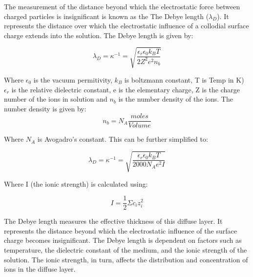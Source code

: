 The measurement of the distance beyond which the electrostatic force between charged particles is insignificant is known as the The Debye length ($\lambda_D$). It represents the distance over which the electrostatic influence of a collodial surface charge extends into the solution. The Debye length is given by:

\begin{equation}
\lambda_D = \kappa^{-1} = \sqrt{ \frac{ \epsilon_r \epsilon_0 k_B T}{2Z^2 e^2 n_b}}
\end{equation}

Where $\epsilon_0$ is the vacuum permitivity, $k_B$ is boltzmann constant, T is  Temp in K) 
$\epsilon_r$ is the relative dielectric constant, e is the elementary charge, Z is the charge number of the ions in solution and $n_b$ is the number density of the ions. %
The number density is given by:
\begin{equation}
n_b = N_A \frac{moles} {Volume}
\end{equation}

Where $N_A$ is Avogadro's constant. This can be further simplified to:

\begin{equation}
 \lambda_D = \kappa^{-1} = \sqrt{ \frac{ \epsilon_r \epsilon_0 k_B T}{2000N_A e^2 I}}
\end{equation}

Where I (the ionic strength) is calculated using:

\begin{equation} 
I = \frac{1}{2} \Sigma c_i z_i^2
\end{equation}

The Debye length measures the effective thickness of this diffuse layer. It represents the distance beyond which the electrostatic influence of the surface charge becomes insignificant. The Debye length is dependent on factors such as temperature, the dielectric constant of the medium, and the ionic strength of the solution. The ionic strength, in turn, affects the distribution and concentration of ions in the diffuse layer.


